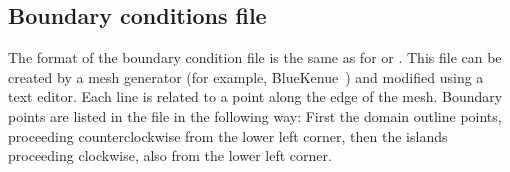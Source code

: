 



\subsection{Boundary conditions file}
The format of the boundary condition file is the same as for \teldd or \telddd. 
This file can be created by a mesh generator (for example, BlueKenue~\cite{bluekenue}) and modified using a text editor. 
Each line is related to a point along the edge of the mesh. Boundary points are listed in the file in the following way: 
First the domain outline points, proceeding counterclockwise from the lower left corner, then the islands proceeding clockwise, also from the lower left corner. 

